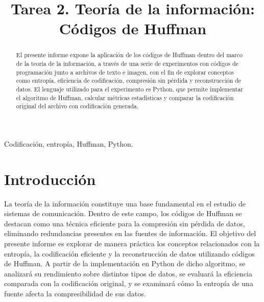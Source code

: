 \documentclass[conference,onecolumn,12pt]{IEEEtran}
\numberwithin{equation}{subsection}
\begin{document}
\title{Tarea 2. Teoría de la información: \\Códigos de Huffman}
\author{
}


\maketitle
\thispagestyle{plain}
\pagestyle{plain}

\begin{abstract} 

El presente informe expone la aplicación de los códigos de Huffman dentro del marco de la teoría de la información, a través de una serie de experimentos con códigos de programación junto a archivos de texto e imagen, con el fin de explorar conceptos como entropía, eficiencia de codificación, compresión sin pérdida y reconstrucción de datos. El lenguaje utilizado para el experimento es Python, que permite implementar el algoritmo de Huffman, calcular métricas estadísticas y comparar la codificación original del archivo con codificación generada.

\end{abstract} 
\begin{IEEEkeywords} Codificación, entropía, Huffman, Python.
\end{IEEEkeywords} 

\section{Introducción}

La teoría de la información constituye una base fundamental en el estudio de sistemas de comunicación. Dentro de este campo, los códigos de Huffman se destacan como una técnica eficiente para la compresión sin pérdida de datos, eliminando redundancias presentes en las fuentes de información. El objetivo del presente informe es explorar de manera práctica los conceptos relacionados con la entropía, la codificación eficiente y la reconstrucción de datos utilizando códigos de Huffman. A partir de la implementación en Python de dicho algoritmo, se analizará su rendimiento sobre distintos tipos de datos, se evaluará la eficiencia comparada con la codificación original, y se examinará cómo la entropía de una fuente afecta la compresibilidad de sus datos. 
\end{document}
